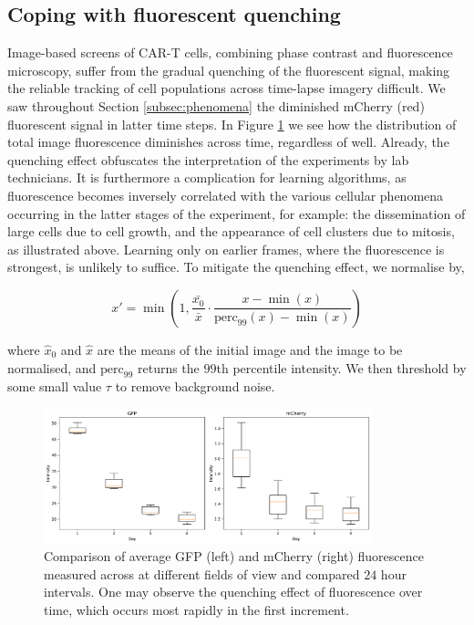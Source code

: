 \subsection{Coping with fluorescent quenching}

Image-based screens of CAR-T cells, combining phase contrast and fluorescence microscopy, suffer from the gradual quenching of the fluorescent signal, making the reliable tracking of cell populations across time-lapse imagery difficult. We saw throughout Section \ref{subsec:phenomena} the diminished mCherry (red) fluorescent signal in latter time steps. In Figure \ref{fig:unnormalised_channels} we see how the distribution of total image fluorescence diminishes across time, regardless of well. Already, the quenching effect obfuscates the interpretation of the experiments by lab technicians. It is furthermore a complication for learning algorithms, as fluorescence becomes inversely correlated with the various cellular phenomena occurring in the latter stages of the experiment, for example: the dissemination of large cells due to cell growth, and the appearance of cell clusters due to mitosis, as illustrated above. Learning only on earlier frames, where the fluorescence is strongest, is unlikely to suffice. To mitigate the quenching effect, we normalise by,

\begin{equation}
x' = \min(1, \frac{\bar{x_0}}{\bar{x}}\cdot\frac{x - \min(x)}{\text{perc}_{99}(x) - \min(x)})
\end{equation}

where $\hat{x}_0$ and $\hat{x}$ are the means of the initial image and the image to be normalised, and $\text{perc}_{99}$ returns the $99$th percentile intensity. We then threshold by some small value $\tau$ to remove background noise.

\begin{figure}[h!]
\centering
\includegraphics[width=0.85\textwidth]{img/unnormalised_channels.pdf}
\caption{Comparison of average GFP (left) and mCherry (right) fluorescence measured across at different fields of view and compared $24$ hour intervals. One may observe the quenching effect of fluorescence over time, which occurs most rapidly in the first increment.}
\label{fig:unnormalised_channels}
\end{figure}

